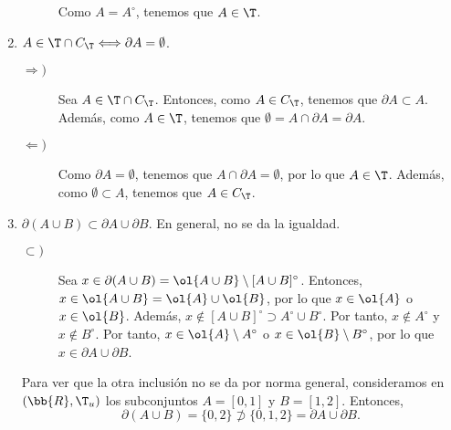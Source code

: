 \begin{enumerate}
\begin{description}
        Como $A=A^\circ$, tenemos que $A\in \T$.
    \end{description}
    
    \item $A \in \T\cap C_\T\Longleftrightarrow \partial A=\emptyset$.
    \begin{description}
        \item[$\Longrightarrow)$] Sea $A\in \T\cap C_\T$. Entonces, como $A\in C_\T$, tenemos que $\partial A\subset A$. Además, como $A\in \T$, tenemos que $\emptyset = A\cap \partial A = \partial A$.

        \item[$\Longleftarrow)$] Como $\partial A=\emptyset$, tenemos que $A\cap \partial A=\emptyset$, por lo que $A\in \T$. Además, como $\emptyset \subset A$, tenemos que $A\in C_\T$.
    \end{description}
    
    \item $\partial (A\cup B)\subset \partial A\cup \partial B$. En general, no se da la igualdad.

    \begin{description}
        \item[$\subset)$] Sea $x\in \partial (A\cup B)=\ol{A\cup B}\setminus [A\cup B]^\circ$. Entonces, $x\in \ol{A\cup B}= \ol{A}\cup \ol{B}$, por lo que $x\in \ol{A}$ o $x\in \ol{B}$. Además, $x\notin [A\cup B]^\circ\supset A^\circ \cup B^\circ$. Por tanto, $x \notin A^\circ$ y $x\notin B^\circ$. Por tanto, $x\in \ol{A}\setminus A^\circ$ o $x\in \ol{B}\setminus B^\circ$, por lo que $x\in \partial A \cup \partial B$.
    \end{description}

    Para ver que la otra inclusión no se da por norma general, consideramos en $(\bb{R},\T_u)$ los subconjuntos $A=[0,1]$ y $B=[1,2]$. Entonces,
    $$ \partial (A\cup B) = \{0,2\}\not\supset \{0,1,2\}=\partial A\cup \partial B.$$
\end{enumerate}

